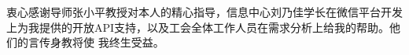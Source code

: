 \begin{acknowledgement}
  衷心感谢导师张小平教授对本人的精心指导，信息中心刘乃佳学长在微信平台开发上为我提供的开放API支持，以及工会全体工作人员在需求分析上给我的帮助。他们的言传身教将使
  我终生受益。
\end{acknowledgement}

